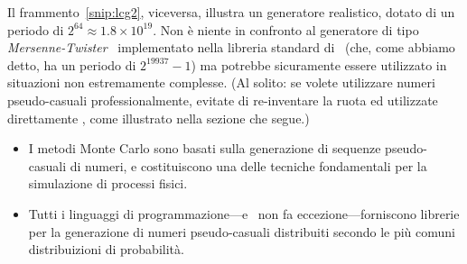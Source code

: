 \begin{snippet}[htb!]
  \bigskip %
\end{snippet}

Il frammento~\ref{snip:lcg2}, viceversa, illustra un generatore realistico,
dotato di un periodo di $2^{64} \approx 1.8 \times 10^{19}$. Non è niente in
confronto al generatore di tipo \emph{Mersenne-Twister}~\cite{mersenne_twister}
implementato nella libreria standard di \python\ (che, come abbiamo detto, ha un
periodo di $2^{19937} - 1$) ma potrebbe sicuramente essere utilizzato in
situazioni non estremamente complesse. (Al solito: se volete utilizzare
numeri pseudo-casuali professionalmente, evitate di re-inventare la ruota ed
utilizzate direttamente \numpy, come illustrato nella sezione che segue.)





\summary


\begin{itemize}
  \item I metodi Monte Carlo sono basati sulla generazione di sequenze
  pseudo-casuali di numeri, e costituiscono una delle tecniche fondamentali per
  la simulazione di processi fisici.
  \item Tutti i linguaggi di programmazione---e \python\ non fa eccezione---forniscono
  librerie per la generazione di numeri pseudo-casuali distribuiti secondo
  le più comuni distribuizioni di probabilità.
\end{itemize}
